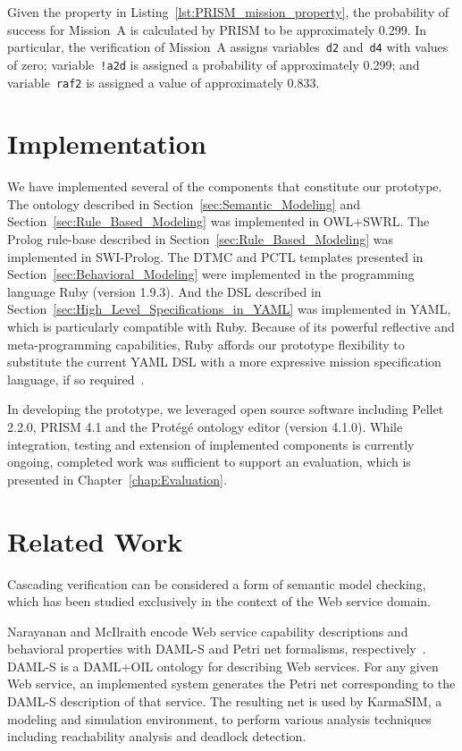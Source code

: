 Given the property in Listing~\ref{lst:PRISM_mission_property}, the probability of success for Mission~A is calculated by PRISM to be approximately 0.299. In particular, the verification of Mission~A assigns variables~\texttt{d2} and~\texttt{d4} with values of zero; variable~\texttt{!a2d} is assigned a probability of approximately 0.299; and variable~\texttt{raf2} is assigned a value of approximately 0.833.

\section{Implementation}
\label{sec:Implementation}

We have implemented several of the components that constitute our prototype. The ontology described in Section~\ref{sec:Semantic_Modeling} and Section~\ref{sec:Rule_Based_Modeling} was implemented in OWL+SWRL\@. The Prolog rule-base described in Section~\ref{sec:Rule_Based_Modeling} was implemented in SWI-Prolog. The DTMC and PCTL templates presented in Section~\ref{sec:Behavioral_Modeling} were implemented in the programming language Ruby (version 1.9.3). And the DSL described in Section~\ref{sec:High_Level_Specifications_in_YAML} was implemented in YAML, which is particularly compatible with Ruby. Because of its powerful reflective and meta-programming capabilities, Ruby affords our prototype flexibility to substitute the current YAML DSL with a more expressive mission specification language, if so required~\cite{Flanagan_2008,Perrotta_2010}.

In developing the prototype, we leveraged open source software including Pellet 2.2.0, PRISM 4.1 and the Prot\'{e}g\'{e} ontology editor (version 4.1.0). While integration, testing and extension of implemented components is currently ongoing, completed work was sufficient to support an evaluation, which is presented in Chapter~\ref{chap:Evaluation}.

\section{Related Work}
\label{sec:Cascading_Verification_Related_Work}

Cascading verification can be considered a form of semantic model checking, which has been studied exclusively in the context of the Web service domain.

Narayanan and McIlraith encode Web service capability descriptions and behavioral properties with DAML-S and Petri net formalisms, respectively~\cite{Narayanan_2002}. DAML-S is a DAML+OIL ontology for describing Web services. For any given Web service, an implemented system generates the Petri net corresponding to the DAML-S description of that service. The resulting net is used by KarmaSIM, a modeling and simulation environment, to perform various analysis techniques including reachability analysis and deadlock detection.

